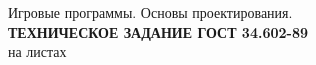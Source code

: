 \documentclass[a4paper, 14pt]{extreport}
\begin{document}
    \begin{titlepage}
        \clearpage
        \vspace*{\fill}
        \begin{center}
            \large
            \begin{minipage}{\textwidth}
                \centering
                Игровые программы. Основы проектирования.\\
                \textbf{ТЕХНИЧЕСКОЕ ЗАДАНИЕ ГОСТ 34.602-89}\\
                на \pageref{LastPage} листах
            \end{minipage}
        \end{center}
        \vfill
        \clearpage
    \end{titlepage}
    \tableofcontents
    \newpage
    
\end{document}
